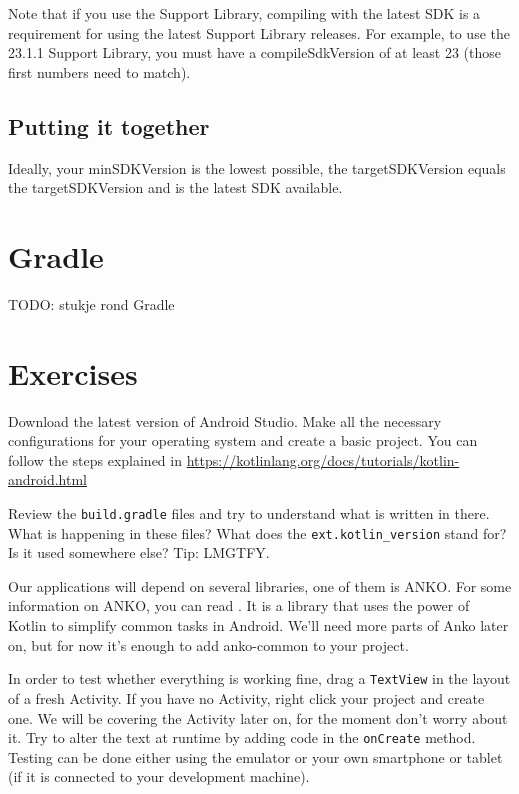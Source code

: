Note that if you use the Support Library, compiling with the latest SDK is a requirement for using the latest Support Library releases.
For example, to use the 23.1.1 Support Library, you must have a compileSdkVersion of at least 23 (those first numbers need to match).

\subsection{Putting it together}
Ideally, your minSDKVersion is the lowest possible, the targetSDKVersion equals the targetSDKVersion and is the latest SDK available.

\section{Gradle}
TODO: stukje rond Gradle


\section{Exercises}
\begin{exercise}
	Download the latest version of Android Studio.
	Make all the necessary configurations for your operating system and create a basic project.
	You can follow the steps explained in \url{https://kotlinlang.org/docs/tutorials/kotlin-android.html}
\end{exercise}

\begin{exercise}
	Review the \texttt{build.gradle} files and try to understand what is written in there.
	What is happening in these files?
	What does the \texttt{ext.kotlin\_version} stand for?
	Is it used somewhere else? Tip: LMGTFY.
\end{exercise}

 \begin{exercise}
 	Our applications will depend on several libraries, one of them is ANKO.
	For some information on ANKO, you can read \cite{Bukros2017}.
	It is  a library that uses the power of Kotlin to simplify common tasks in Android.
	We’ll need more parts of Anko later on, but for now it’s enough to add anko-common to your project.
 \end{exercise}

\begin{exercise}
	In order to test whether everything is working fine, drag a \texttt{TextView} in the layout of a fresh Activity.
	If you have no Activity, right click your project and create one.
	We will be covering the Activity later on, for the moment don't worry about it.
	Try to alter the text at runtime by adding code in the \texttt{onCreate} method.
	Testing can be done either using the emulator or your own smartphone or tablet (if it is connected to your development machine).
\end{exercise}